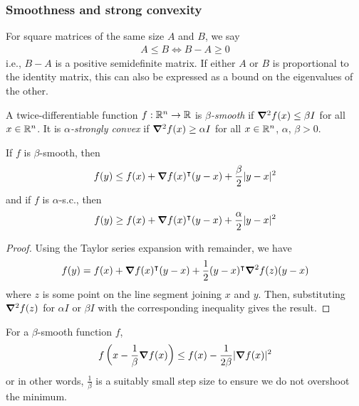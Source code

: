 \documentclass{../../template/note}
\begin{document}
    \subsubsection{Smoothness and strong convexity}

    \begin{definition}
        For square matrices of the same size $A$ and $B$, we say
        \begin{align*}
            A \leq B \iff B - A \geq 0
        \end{align*}
        i.e., $B-A$ is a positive semidefinite matrix. If either $A$ or $B$ is proportional to the identity matrix, this can also be expressed as a bound on the eigenvalues of the other.        
    \end{definition}    

    \begin{definition}
        A twice-differentiable function $f: \mathbb R^n \to \mathbb R$ is \emph{$\beta$-smooth} if $\grad^2 f(x) \leq \beta I$ for all $x \in \mathbb R^n$. It is \emph{$\alpha$-strongly convex} if $\grad^2 f(x) \geq \alpha I$ for all $x \in \mathbb R^n$, $\alpha$, $\beta > 0$.
    \end{definition}
    
    \begin{theorem}
        If $f$ is $\beta$-smooth, then
        \begin{align*}
            f(y) \leq f(x) + \grad f(x)^\intercal (y-x) + \frac \beta 2 |y-x|^2
        \end{align*}
        and if $f$ is $\alpha$-s.c., then
        \begin{align*}
            f(y) \geq f(x) + \grad f(x)^\intercal (y-x) + \frac \alpha 2 |y-x|^2
        \end{align*}
    \end{theorem}
    
    \begin{proof}
        Using the Taylor series expansion with remainder, we have
        \begin{align*}
            f(y) = f(x) + \grad f(x)^\intercal (y-x) + \frac 1 2 (y-x)^\intercal \grad^2f(z)(y-x)
        \end{align*}
        where $z$ is some point on the line segment joining $x$ and $y$. Then, substituting $\grad^2 f(z)$ for $\alpha I$ or $\beta I$ with the corresponding inequality gives the result.        
    \end{proof}
    
    \begin{corollary}
        \label{beta-smooth-bound}
        For a $\beta$-smooth function $f$,
        \begin{align*}
            f\left(x - \frac 1 \beta \grad f(x)\right) \leq f(x) - \frac 1 {2\beta} |\grad f(x)|^2 
        \end{align*}
        or in other words, $\frac 1 \beta$ is a suitably small step size to ensure we do not overshoot the minimum.        
    \end{corollary}
    
\end{document}
